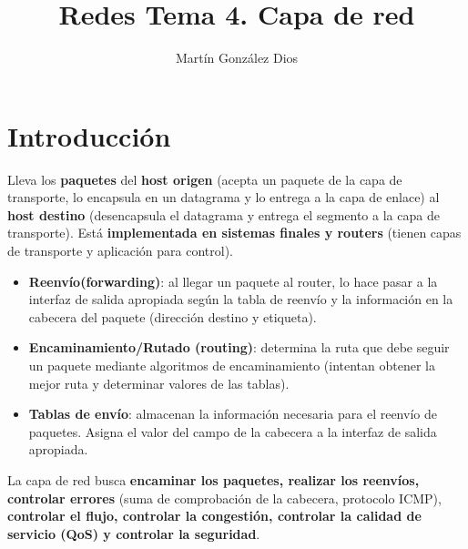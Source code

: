 \documentclass{article}
\title{Redes Tema 4. Capa de red}
\author{Martín González Dios}
\begin{document}
\maketitle

\section{Introducción}
Lleva los \textbf{paquetes} del \textbf{host origen} (acepta un paquete de la capa de transporte, lo encapsula en un datagrama y lo entrega a la capa de enlace) al \textbf{host destino} (desencapsula el datagrama y entrega el segmento a la capa de transporte). Está \textbf{implementada en sistemas finales y routers} (tienen capas de transporte y aplicación para control). \\

\begin{itemize}
    \item \textbf{Reenvío(forwarding)}: al llegar un paquete al router, lo hace pasar a la interfaz de salida apropiada según la tabla de reenvío y la información en la cabecera del paquete (dirección destino y etiqueta).

    \item \textbf{Encaminamiento/Rutado (routing)}: determina la ruta que debe seguir un paquete mediante algoritmos de encaminamiento (intentan obtener la mejor ruta y determinar valores de las tablas).

    \item \textbf{Tablas de envío}: almacenan la información necesaria para el reenvío de paquetes. Asigna el valor del campo de la cabecera a la interfaz de salida apropiada.
\end{itemize}

La capa de red busca \textbf{encaminar los paquetes, realizar los reenvíos, controlar errores} (suma de comprobación de la cabecera, protocolo ICMP), \textbf{controlar el flujo, controlar la congestión, controlar la calidad de servicio (QoS) y controlar la seguridad}. \\

\newpage
\end{document}
